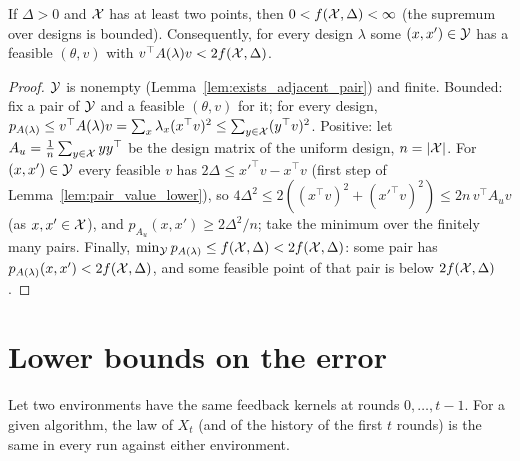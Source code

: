 \begin{lemma}[Positivity of $f$]
  \label{lem:opt_value_pos}
  \leanok
  If $\Delta > 0$ and $\mathcal{X}$ has at least two points, then $0 < f(\mathcal{X}, \Delta) < \infty$ (the supremum
  over designs is bounded). Consequently, for every design $\lambda$ some $(x, x') \in \mathcal{Y}$ has a
  feasible $(\theta, v)$ with $v^\top A(\lambda) v < 2 f(\mathcal{X}, \Delta)$.
\end{lemma}

\begin{proof}
  \leanok
  $\mathcal{Y}$ is nonempty (Lemma~\ref{lem:exists_adjacent_pair}) and finite. Bounded: fix a pair of $\mathcal{Y}$
  and a feasible $(\theta, v)$ for it; for every design,
  $p_{A(\lambda)} \le v^\top A(\lambda) v = \sum_x \lambda_x (x^\top v)^2 \le \sum_{y \in \mathcal{X}}
  (y^\top v)^2$. Positive: let $A_u = \frac1n \sum_{y \in \mathcal{X}} y y^\top$ be the design matrix of the
  uniform design, $n = \lvert \mathcal{X} \rvert$. For $(x, x') \in \mathcal{Y}$ every feasible $v$ has
  $2\Delta \le x'^\top v - x^\top v$ (first step of Lemma~\ref{lem:pair_value_lower}), so
  $4 \Delta^2 \le 2 ((x^\top v)^2 + (x'^\top v)^2) \le 2 n\, v^\top A_u v$ (as $x, x' \in \mathcal{X}$), and
  $p_{A_u}(x, x') \ge 2\Delta^2 / n$; take the minimum over the finitely many pairs. Finally,
  $\min_{\mathcal{Y}} p_{A(\lambda)} \le f(\mathcal{X}, \Delta) < 2 f(\mathcal{X}, \Delta)$: some pair has
  $p_{A(\lambda)}(x, x') < 2 f(\mathcal{X}, \Delta)$, and some feasible point of that pair is below
  $2 f(\mathcal{X}, \Delta)$.
\end{proof}

\section{Lower bounds on the error}

\begin{lemma}
  \label{lem:actions_law_agree}
  \leanok
  Let two environments have the same feedback kernels at rounds $0, \dots, t - 1$. For a given
  algorithm, the law of $X_t$ (and of the history of the first $t$ rounds) is the same in every run
  against either environment.
\end{lemma}

